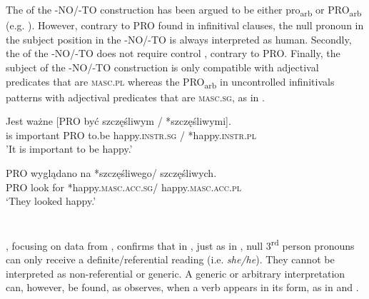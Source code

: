 \documentclass[output=paper]{LSP/langsci}
\begin{document}
The  of the -NO/-TO construction has been argued to be either pro\textsubscript{arb} \citep{Dziwirek1994} or PRO\textsubscript{arb}  (e.g. \citealt{Maling1993,Lavine2005}). However, contrary to PRO found in infinitival clauses, the null pronoun in the subject position in the -NO/-TO is always interpreted as human. Secondly, the  of the -NO/-TO does not require control \citep{Kibort2004}, contrary to PRO. Finally, the subject of the -NO/-TO construction is only compatible with adjectival predicates that are \textsc{masc}.\textsc{pl} whereas the PRO\textsubscript{arb} in  uncontrolled infinitivals patterns with adjectival predicates that are \textsc{masc}.\textsc{sg}, as in  \citep[footnote 26]{Lavine2005}.

\ea%
    \label{ex:9.krzek}
\ea
\gll Jest ważne [PRO być   szczęśliwym / *szczęśliwymi].\\
      is   important  PRO to.be happy.\textsc{instr}.\textsc{sg} / *happy.\textsc{instr}.\textsc{pl}\\
\glt  'It is important to be happy.’

\ex
\gll PRO wyglądano na  *szczęśliwego/ szczęśliwych.\\
         PRO look for *happy.\textsc{masc}.\textsc{acc}.\textsc{sg}/ happy.\textsc{masc}.\textsc{acc}.\textsc{pl}\\
         \glt ‘They looked happy.’
\z
\z

\section{\citet{FassiFehri2009}}

\citet{FassiFehri2009}, focusing on data from , confirms that in , just as in , null 3\textsuperscript{rd} person pronouns can only receive a definite/referential reading (i.e. \textit{she/he}). They cannot be interpreted as non-referential or generic. A generic or arbitrary interpretation can, however, be found, as \citet{FassiFehri2009} observes, when a verb appears in its  form, as in  and .

\z
\end{document}

